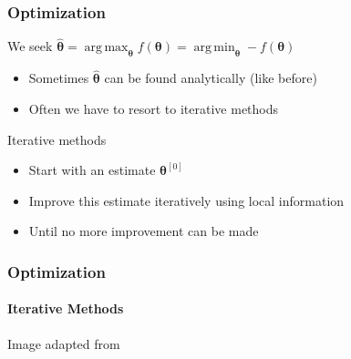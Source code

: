 \documentclass[xetex,professionalfont]{beamer}
\DeclareMathOperator*{\argmin}{arg\,min}
\DeclareMathOperator*{\argmax}{arg\,max}
\newcommand{\bth}{\boldsymbol{\theta}}
\begin{document}

\begin{frame}
\frametitle{Optimization}

We seek $\hat{\bth}=\argmax_{\bth} f(\bth)=\argmin_{\bth}-f(\bth)$ %
\begin{itemize}
    \item Sometimes $\hat{\bth}$ can be found analytically (like before) %
    \item Often we have to resort to iterative methods
\end{itemize}

\bigskip
Iterative methods
\begin{itemize}
    \item Start with an estimate $\bth^{[0]}$
    \item Improve this estimate iteratively using local information %
    \item Until no more improvement can be made
\end{itemize}

\end{frame}


\begin{frame}
\frametitle{Optimization}
\framesubtitle{Iterative Methods}

\begin{center}
    {\centering Image adapted from \cite{prince12}}
\end{center}

\end{frame}
\end{document}
